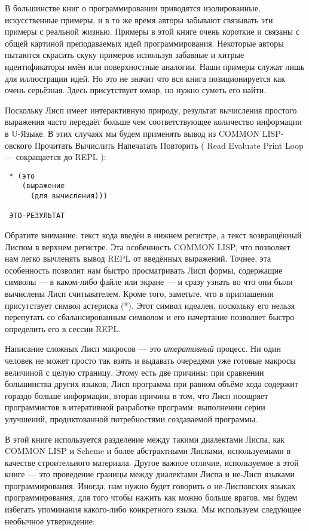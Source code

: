 В большинстве книг о программировании приводятся изолированные, искусственные примеры, и в то же время авторы забывают связывать эти примеры с реальной жизнью. Примеры в этой книге очень короткие и связаны с общей картиной преподаваемых идей программирования. Некоторые авторы пытаются скрасить скуку примеров используя забавные и хитрые идентификаторы имён или поверхностные аналогии. Наши примеры служат лишь для иллюстрации идей. Но это не значит что вся книга позиционируется как очень серьёзная. Здесь присутствует юмор, но нужно суметь его найти.

Поскольку Лисп имеет интерактивную природу, результат вычисления простого выражения часто передаёт больше чем соответствующее количество информации в U-Языке. В этих случаях мы будем применять вывод из COMMON LISP-овс\-кого Прочитать Вычислить Напечатать Повторить ( Read Evaluate Print Loop --- сокращается до REPL ):

\begin{verbatim}
 * (это
    (выражение
      (для вычисления)))

 ЭТО-РЕЗУЛЬТАТ
\end{verbatim}

Обратите внимание: текст кода введён в нижнем регистре, а текст возвращённый Лиспом в верхнем регистре. Эта особенность COMMON LISP, что позволяет нам легко вычленять вывод REPL от введённых выражений. Точнее, эта особенность позволит нам быстро просматривать Лисп формы, содержащие символы --- в каком-либо файле или экране --- и сразу узнать во что они были вычислены Лисп считывателем. Кроме того, заметьте, что в приглашении присутствует символ астериска (*). Этот символ идеален, поскольку его нельзя перепутать со сбалансированным символом и его начертание позволяет быстро определить его в сессии REPL.

Написание сложных Лисп макросов --- это \emph{итеративный} процесс. Ни один человек не может просто так взять и выдавать очередями уже готовые макросы величиной с целую страницу. Этому есть две причины: при сравнении большинства других языков, Лисп программа при равном объёме кода содержит гораздо больше информации, вторая причина в том, что Лисп поощряет программистов в итеративной разработке программ: выполнении серии улучшений, продиктованной потребностями создаваемой программы.

В этой книге используется разделение между такими диалектами Лиспа, как COMMON LISP и Scheme и более абстрактными Лиспами, используемыми в качестве строительного материала. Другое важное отличие, используемое в этой книге --- это проведение границы между диалектами Лиспа и не-Лисп языками программирования. Иногда, нам нужно будет говорить о не-Лисповских языках программирования, для того чтобы нажить как можно больше врагов, мы будем избегать упоминания какого-либо конкретного языка. Мы используем следующее необычное утверждение:

